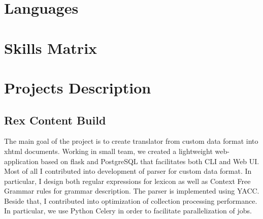 \documentclass[11pt,a4paper,sans]{moderncv}        %
\begin{document}

\section{Languages}

\section{Skills Matrix}

\section{Projects Description}
\subsection{Rex Content Build}
The main goal of the project is to create translator from custom data format into xhtml documents.
Working in small team, we created a lightweight web-application based on flask and PostgreSQL that facilitates both CLI and Web UI. Most of all I contributed into development of parser for custom data format. In particular, I design both regular expressions for lexicon as well as Context Free Grammar rules for grammar description. The parser is implemented using YACC.
Beside that, I contributed into optimization of collection processing performance. In particular, we use Python Celery in order to facilitate parallelization of jobs.
\end{document}

